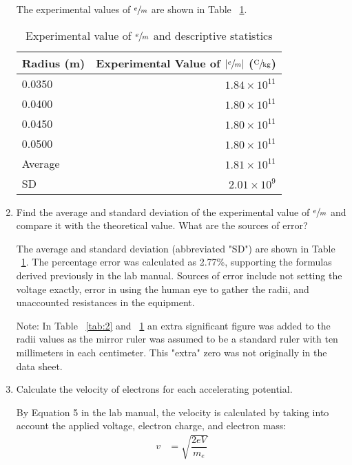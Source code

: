 \documentclass [12pt, letterpaper, twoside] {article}
\begin{document}
\begin{enumerate}
    The experimental values of \(\sfrac{e}{m}\) are shown in Table ~\ref{tab:3}.

    \begin{table}
      \centering
      \begin{tabular}{| l | r |}
        \hline\hline
        Radius (m) & Experimental Value of \(|\sfrac{e}{m}|\) (\(\sfrac{\text{C}}{\text{kg}}\)) \\
        \hline
        0.0350 & \(1.84\times{10}^{11}\) \\ %
        \hline
        0.0400 & \(1.80\times{10}^{11}\) \\ %
        \hline
        0.0450 & \(1.80\times{10}^{11}\) \\ %
        \hline
        0.0500 & \(1.80\times{10}^{11}\) \\ %
        \hline
        Average & \(1.81\times{10}^{11}\) \\ %
        \hline
        SD & \(2.01\times{10}^{9}\) \\ %
        \hline\hline
      \end{tabular}
      \caption{Experimental value of \(\sfrac{e}{m}\) and descriptive statistics}
      \label{tab:3}
    \end{table}

  \item{Find the average and standard deviation of the experimental value of \(\sfrac{e}{m}\) and compare it with the theoretical value. What are the sources of error?}

    The average and standard deviation (abbreviated "SD") are shown in Table ~\ref{tab:3}. The percentage error was calculated as 2.77\%, supporting the formulas derived previously in the lab manual. Sources of error include not setting the voltage exactly, error in using the human eye to gather the radii, and unaccounted resistances in the equipment. %

    Note: In Table ~\ref{tab:2} and ~\ref{tab:3} an extra significant figure was added to the radii values as the mirror ruler was assumed to be a standard ruler with ten millimeters in each centimeter. This "extra" zero was not originally in the data sheet.

  \item{Calculate the velocity of electrons for each accelerating potential.}
  
    By Equation 5 in the lab manual, the velocity is calculated by taking into account the applied voltage, electron charge, and electron mass:
      \begin{equation*}
        \begin{split}
          v &= \sqrt{\dfrac{2eV}{m_{e}}} \\
        \end{split}
      \end{equation*}


\end{enumerate}
\end{document}
